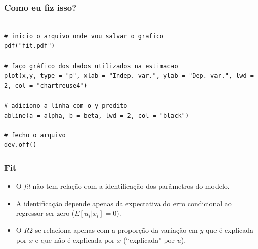 \documentclass[10pt,slides,xcolor=pdftex,dvipsnames,table]{beamer}
\begin{document}
\begin{frame}[fragile]
	\frametitle{Como eu fiz isso?}

\begin{lstlisting}

# inicio o arquivo onde vou salvar o grafico
pdf("fit.pdf")   

# faço gráfico dos dados utilizados na estimacao 
plot(x,y, type = "p", xlab = "Indep. var.", ylab = "Dep. var.", lwd = 2, col = "chartreuse4") 

# adiciono a linha com o y predito
abline(a = alpha, b = beta, lwd = 2, col = "black") 

# fecho o arquivo
dev.off()   

\end{lstlisting}

\end{frame}


\begin{frame}[fragile]
	\frametitle{Fit}
	
\begin{itemize}\itemsep1.2em

\item O \textit{fit} não tem relação com a identificação dos parâmetros do modelo. 

\item A identificação depende apenas da expectativa do erro condicional ao regressor ser zero ($E[u_i|x_i]=0$).

\item O $R2$ se relaciona apenas com a proporção da variação em $y$ que é explicada por $x$ e que não é explicada por $x$ (``explicada'' por $u$).

\end{itemize}

\end{frame}

\end{document}

